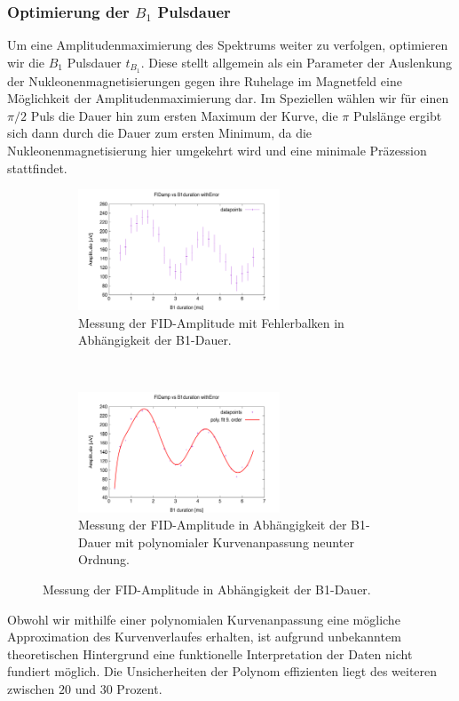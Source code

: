 \documentclass{article}
\begin{document}
        \subsubsection*{Optimierung der $B_1$ Pulsdauer}\label{subsubsec:5:B1PulsdauerOptimierung}
            Um eine Amplitudenmaximierung des Spektrums weiter zu verfolgen, optimieren wir die $B_1$ Pulsdauer $t_{B_1}$. Diese stellt allgemein als ein Parameter der Auslenkung der Nukleonenmagnetisierungen gegen ihre Ruhelage im Magnetfeld eine Möglichkeit der Amplitudenmaximierung dar. Im Speziellen wählen wir für einen $\pi/2$ Puls die Dauer hin zum ersten Maximum der Kurve, die $\pi$ Pulslänge ergibt sich dann durch die Dauer zum ersten Minimum, da die Nukleonenmagnetisierung hier umgekehrt wird und eine minimale Präzession stattfindet. 
            \begin{figure}[H]
                \centering
                \begin{subfigure}[t]{0.45\textwidth}
                    \centering
                    \includegraphics[width=6cm]{../Bilddateien/B1DurationFast_FIDamp_vs_B1duration_withError.png}
                    \caption{Messung der FID-Amplitude mit Fehlerbalken in Abhängigkeit der B1-Dauer.}
                    \label{fig:5:FastFIDampVsB1durationWithError}
                \end{subfigure}
                \
                \begin{subfigure}[t]{0.45\textwidth}
                    \centering
                    \includegraphics[width=6cm]{../Bilddateien/B1DurationFast_FIDamp_vs_B1duration_withError_poly.png}
                    \caption{Messung der FID-Amplitude in Abhängigkeit der B1-Dauer mit polynomialer Kurvenanpassung neunter Ordnung.}
                    \label{fig:5:FastFIDampVsB1duration}
                \end{subfigure}
                \caption{Messung der FID-Amplitude in Abhängigkeit der B1-Dauer.}
            \end{figure}
            Obwohl wir mithilfe einer polynomialen Kurvenanpassung eine mögliche Approximation des Kurvenverlaufes erhalten, ist aufgrund unbekanntem theoretischen Hintergrund eine funktionelle Interpretation der Daten nicht fundiert möglich. Die Unsicherheiten der Polynom effizienten liegt des weiteren zwischen $20$ und $30$ Prozent. \\
\end{document}
